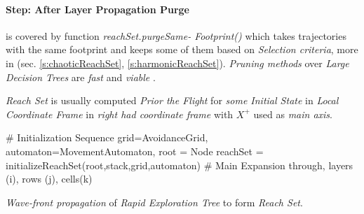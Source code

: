 \paragraph{Step: After Layer Propagation Purge} is covered by function \emph{reachSet.purgeSame- Footprint()} which takes trajectories with the same footprint and keeps some of them based on \emph{Selection criteria}, more in (sec. \ref{s:chaoticReachSet}, \ref{s:harmonicReachSet}). \emph{Pruning methods} over \emph{Large Decision Trees} are \emph{fast} and \emph{viable} \cite{mingers1989empirical}.

\begin{note}
    \emph{Reach Set} is usually computed \emph{Prior the Flight} for \emph{some Initial State} in \emph{Local Coordinate Frame} in \emph{right had coordinate frame} with $X^+$ used as \emph{main axis}.
\end{note}


\begin{algorithm}[H]
    \BlankLine
    \# Initialization Sequence\;
    grid=AvoidanceGrid, automaton=MovementAutomaton, root = Node\;
    reachSet = initializeReachSet(root,stack,grid,automaton)\;
    \BlankLine
    \# Main Expansion through, layers (i), rows (j), cells(k)\;
    \caption{\emph{Wave-front propagation} of \emph{Rapid Exploration Tree} to form \emph{Reach Set}.}
    \label{alg:Wavefront Propagation}
\end{algorithm}





